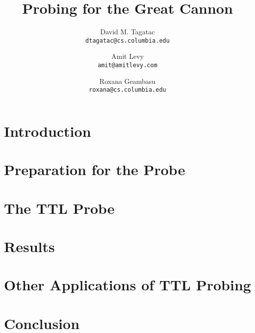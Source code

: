 \documentclass[10pt,twocolumn]{article}
\begin{document}
\title{\bf Probing for the Great Cannon}
\author{
	David M. Tagatac\\
	\texttt{dtagatac@cs.columbia.edu}
	\and
	Amit Levy\\
	\texttt{amit@amitlevy.com}
	\and
	Roxana Geambasu\\
	\texttt{roxana@cs.columbia.edu}
}
\date{}
\maketitle
\thispagestyle{empty}

%

\section{Introduction}


\section{Preparation for the Probe}


\section{The TTL Probe}


\section{Results}


\section{Other Applications of TTL Probing}


\section{Conclusion}


\end{document}
